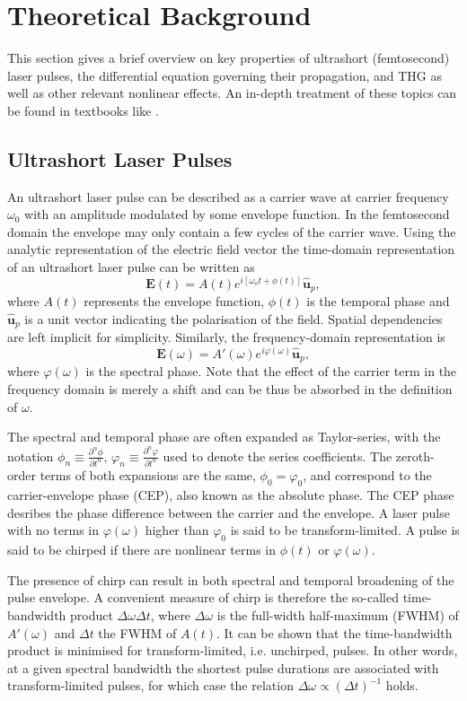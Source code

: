\documentclass[a4paper]{jpconf}
\begin{document}
\section{Theoretical Background}
This section gives a brief overview on key properties of ultrashort (femtosecond) laser pulses, the differential equation governing their propagation, and THG as well as other relevant nonlinear effects. An in-depth treatment of these topics can be found in textbooks like \cite{keller2021, new2011}. 

\subsection{Ultrashort Laser Pulses}
An ultrashort laser pulse can be described as a carrier wave at carrier frequency $\omega_0$ with an amplitude modulated by some envelope function. In the femtosecond domain the envelope may only contain a few cycles of the carrier wave. Using the analytic representation of the electric field vector the time-domain representation of an ultrashort laser pulse can be written as 
\begin{equation}
\mathbf{E}(t) = A(t) e^{i[ \omega_o t + \phi(t)]} \hat{\mathbf{u}}_p,
\end{equation}
where $A(t)$ represents the envelope function, $\phi(t)$ is the temporal phase and $\hat{\mathbf{u}}_p$ is a unit vector indicating the polarisation of the field. Spatial dependencies are left implicit for simplicity. Similarly, the frequency-domain representation is 
\begin{equation}
\mathbf{E}(\omega) = A'(\omega) e^{i \varphi(\omega)} \hat{\mathbf{u}}_p,
\end{equation}
where $\varphi(\omega)$ is the spectral phase. Note that the effect of the carrier term in the frequency domain is merely a shift and can be thus be absorbed in the definition of $\omega$. \par 
The spectral and temporal phase are often expanded as Taylor-series, with the notation $\phi_n \equiv \frac{\partial^n \phi}{\partial t^n}$, $\varphi_n \equiv \frac{\partial^n \varphi}{\partial t^n}$ used to denote the series coefficients. The zeroth-order terms of both expansions are the same, $\phi_0 = \varphi_0$, and correspond to the carrier-envelope phase (CEP), also known as the absolute phase. The CEP phase desribes the phase difference between the carrier and the envelope. A laser pulse with no terms in $\varphi(\omega)$ higher than $\varphi_0$ is said to be transform-limited. A pulse is said to be chirped if there are nonlinear terms in $\phi(t)$ or $\varphi(\omega)$. \par 
The presence of chirp can result in both spectral and temporal broadening of the pulse envelope. A convenient measure of chirp is therefore the so-called time-bandwidth product $\Delta \omega \Delta t$, where $\Delta \omega$ is the full-width half-maximum (FWHM) of $A'(\omega)$ and $\Delta t$ the FWHM of $A(t)$. It can be shown that the time-bandwidth product is minimised for transform-limited, i.e. unchirped, pulses. In other words, at a given spectral bandwidth the shortest pulse durations are associated with transform-limited pulses, for which case the relation $\Delta \omega \propto (\Delta t)^{-1}$ holds.   
\end{document}
